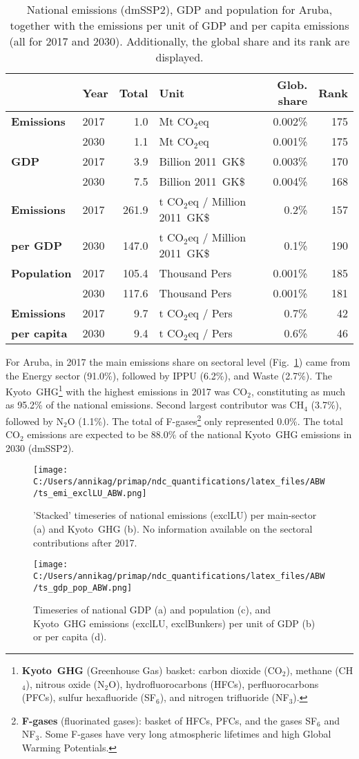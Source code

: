 \documentclass[12pt]{article}
\begin{document}
 \begin{table}[htbp]
 \centering
 \caption{National emissions (dmSSP2), GDP and population for Aruba, together with the emissions per unit of GDP and per capita emissions (all for 2017 and 2030). 
 Additionally, the global share and its rank are displayed.}
 \label{tab:overview}
 \begin{tabular}{l || l r l r r}
 \bfseries  & \bfseries Year & \bfseries Total & \bfseries Unit & \bfseries Glob. share & \bfseries Rank \tabularnewline \hline \hline
 \bfseries Emissions & 2017 & 1.0 & Mt CO$_2$eq & 0.002\% & 175 \tabularnewline 
 \bfseries  & 2030 & 1.1 & Mt CO$_2$eq & 0.001\% & 175 \tabularnewline \hline
 \bfseries GDP & 2017 & 3.9 & Billion 2011~GK\$ & 0.003\% & 170 \tabularnewline 
 \bfseries  & 2030 & 7.5 & Billion 2011~GK\$ & 0.004\% & 168 \tabularnewline \hline
 \bfseries Emissions & 2017 & 261.9 & t CO$_2$eq / Million 2011~GK\$ & 0.2\% & 157 \tabularnewline 
 \bfseries per GDP & 2030 & 147.0 & t CO$_2$eq / Million 2011~GK\$ & 0.1\% & 190 \tabularnewline \hline
 \bfseries Population & 2017 & 105.4 & Thousand Pers & 0.001\% & 185 \tabularnewline 
 \bfseries  & 2030 & 117.6 & Thousand Pers & 0.001\% & 181 \tabularnewline \hline
 \bfseries Emissions & 2017 & 9.7 & t CO$_2$eq /  Pers & 0.7\% & 42 \tabularnewline 
 \bfseries per capita & 2030 & 9.4 & t CO$_2$eq /  Pers & 0.6\% & 46 \tabularnewline 
 \end{tabular}
 \end{table}

 For Aruba, in 2017 the main emissions share on sectoral level (Fig.~\ref{fig:tsEmi}) came from the Energy sector (91.0\%), followed by IPPU (6.2\%), and Waste (2.7\%). 
 The Kyoto~GHG\footnote{\textbf{Kyoto~GHG} (Greenhouse Gas) basket: carbon dioxide (CO$_2$), methane (CH$_4$), nitrous oxide (N$_2$O), hydrofluorocarbons (HFCs), perfluorocarbons (PFCs), sulfur hexafluoride (SF$_6$), and nitrogen trifluoride (NF$_3$).} with the highest emissions in 2017 was CO$_2$, constituting as much as 95.2\% of the national emissions. 
 Second largest contributor was CH$_4$ (3.7\%), followed by N$_2$O (1.1\%). 
 The total of F-gases\footnote{\textbf{F-gases} (fluorinated gases): basket of HFCs, PFCs, and the gases SF$_6$ and NF$_3$. 
 Some F-gases have very long atmospheric lifetimes and high Global Warming Potentials.} only represented 0.0\%.
 The total CO$_2$ emissions are expected to be 88.0\% of the national Kyoto~GHG emissions in 2030 (dmSSP2).
 \begin{figure}[htbp]
 \centering
 \texttt{[image: C:/Users/annikag/primap/ndc\_quantifications/latex\_files/ABW/ts\_emi\_exclLU\_ABW.png]}
 \caption{'Stacked' timeseries of national emissions (exclLU) per main-sector (a) and Kyoto~GHG (b). 
 No information available on the sectoral contributions after 2017.}
 \label{fig:tsEmi}
 \end{figure}
 \begin{figure}[htbp]
 \centering
 \texttt{[image: C:/Users/annikag/primap/ndc\_quantifications/latex\_files/ABW/ts\_gdp\_pop\_ABW.png]}
 \caption{Timeseries of national GDP (a) and population (c), and Kyoto~GHG emissions (exclLU, exclBunkers) per unit of GDP (b) or per capita (d).}
 \label{fig:tsSocioEco}
 \end{figure}
\end{document}
